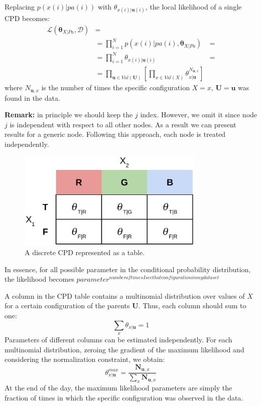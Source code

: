 Replacing $p(x(i)|\mathit{pa}(i))$ with $\theta_{x(i)|\pmb{u}(i)}$, the local likelihood of a single CPD becomes:
\begin{align*}
    \mathcal{L}(\pmb{\theta}_{X|\mathit{Pa}}, \mathcal{D}) &=\\
    &= \prod_{i=1}^N p(x(i)|\mathit{pa}(i), \pmb{\theta}_{X|\mathit{Pa}}) &=\\
    &= \prod_{i=1}^N \theta_{x(i)|\pmb{u}(i)} &=\\
    &= \prod_{\pmb{u} \in \mathit{Val}(\pmb{U})}[\prod_{x \in \mathit{Val}(X)} \theta^{N_{\pmb{u},x}}_{x|\pmb{u}}]
\end{align*}
where $N_{\pmb{u},x}$ is the number of times the specific configuration $X=x$, $\pmb{U}=\pmb{u}$ was found in the data. \newline

\textbf{Remark:} in principle we should keep the $j$ index. However, we omit it since node $j$ is independent with respect to all other nodes. As a result we can present results for a generic node. Following this approach, each node is treated independently. \newline

\begin{figure}
    \centering
    \includegraphics[width=0.8\textwidth]{images/exampleMaximumLikelihoodEstimationCompleteData.png}
    \caption{A discrete CPD represented as a table.}
    \label{fig:exampleMaximumLikelihoodEstimationCompleteData}
\end{figure}

In essence, for all possible parameter in the conditional probability distribution, the likelihood becomes $\mathit{parameter}^{\mathit{number of times I see that configuration in my dataset}}$ \newline

A column in the CPD table contains a multinomial distribution over values of $X$ for a certain configuration of the parents $\pmb{U}$. Thus, each column should sum to one:
$$\sum_x \theta_{x|\pmb{u}}=1$$
Parameters of different columns can be estimated independently. For each multinomial distribution, zeroing the gradient of the maximum likelihood and considering the normalization constraint, we obtain:
$$\theta^{\mathit{max}}_{x|\pmb{u}} = \frac{\pmb{N}_{\pmb{u},x}}{\sum_x \pmb{N}_{\pmb{u},x}}$$
At the end of the day, the maximum likelihood parameters are simply the fraction of times in which the specific configuration was observed in the data. \newline

